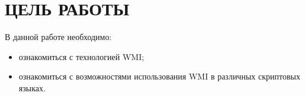 \section{ЦЕЛЬ РАБОТЫ}

В данной работе необходимо:

\begin{itemize}

  \item ознакомиться с технологией WMI;

  \item ознакомиться с возможностями использования WMI в различных
    скриптовых языках.

\end{itemize}

\newpage
